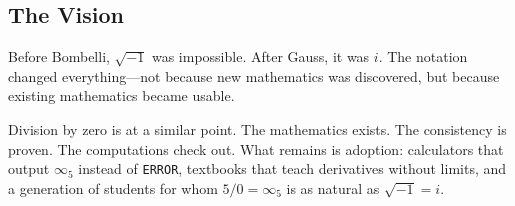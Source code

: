 \documentclass[12pt]{article}
\theoremstyle{definition}
\theoremstyle{remark}
\newcommand{\vi}[1]{\infty_{#1}}        %
\begin{document}
\subsection{The Vision}

Before Bombelli, $\sqrt{-1}$ was impossible. After Gauss, it was $i$.
The notation changed everything---not because new mathematics was
discovered, but because existing mathematics became usable.

Division by zero is at a similar point. The mathematics exists. The
consistency is proven. The computations check out. What remains is
adoption: calculators that output $\vi{5}$ instead of \texttt{ERROR},
textbooks that teach derivatives without limits, and a generation of
students for whom $5/0 = \vi{5}$ is as natural as $\sqrt{-1} = i$.


\end{document}
